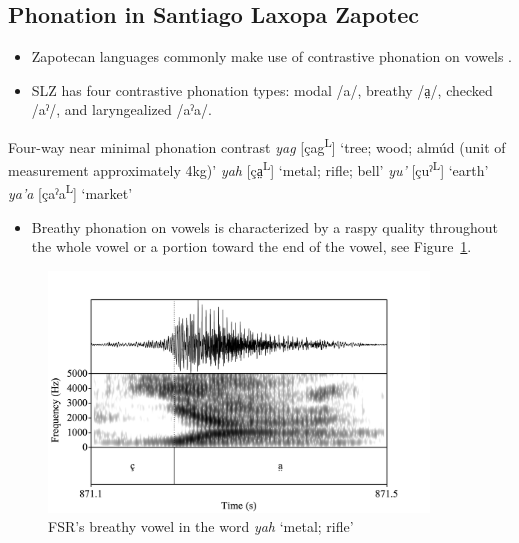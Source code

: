 \documentclass[12pt, letterpaper]{article}
\newcommand{\supr}[1]{\textsuperscript{#1}}
\begin{document}
\subsection{Phonation in Santiago Laxopa Zapotec} \label{sec:Phonation}

\begin{itemize}
	\item Zapotecan languages commonly make use of contrastive phonation on vowels \citep[e.g.,][]{avelinobecerraTopicsYalalagZapotec2004,longDiccionarioZapotecoSan2005,avelinoAcousticElectroglottographicAnalyses2010,lopeznicolasEstudiosFonologiaGramatica2016,chavez-peonInteractionMetricalStructure2010,ariza-garciaPhonationTypesTones2018}.
	\item SLZ has four contrastive phonation types: modal /a/, breathy /a̤/, checked /aˀ/, and laryngealized /aˀa/.
\end{itemize}

\ea \label{ex:YA} Four-way near minimal phonation contrast
	\ea \textit{yag}  [çag\supr{L}] `tree; wood; almúd (unit of measurement approximately 4kg)'
	\ex \textit{yah}  [ça̤\supr{L}] `metal; rifle; bell'
	\ex \textit{yu'}  [çuˀ\supr{L}]  `earth'
	\ex \textit{ya'a}  [çaˀa\supr{L}]  `market'
	\z 
\z 

\begin{itemize}
	\item Breathy phonation on vowels is characterized by a raspy quality throughout the whole vowel or a portion toward the end of the vowel, see Figure~\ref{fig:BreathyVowel}. 
\end{itemize}

\begin{figure}[!h]
	\centering
	\includegraphics[width=0.9\textwidth]{../yah.png}
	\caption{FSR's breathy vowel in the word \textit{yah} `metal; rifle'}
	\label{fig:BreathyVowel}
\end{figure}
\end{document}
